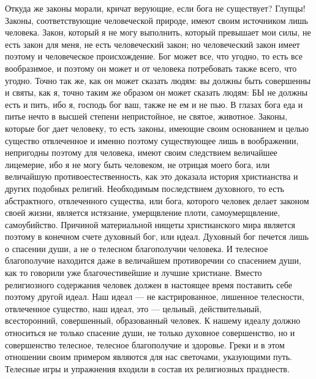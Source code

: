 \documentclass[12pt]{article}
\begin{document}
Откуда же законы морали, кричат верующие, если бога не существует? Глупцы! Законы, соответствующие человеческой природе, имеют своим источником лишь человека. Закон, который я не могу выполнить, который превышает мои силы, не есть закон для меня, не есть человеческий закон; но человеческий закон имеет поэтому и человеческое происхождение. Бог может все, что угодно, то есть все вообразимое, и поэтому он может и от человека потребовать также всего, что угодно. Точно так же, как он может сказать людям: вы должны быть совершенны и святы, как я, точно таким же образом он может сказать людям: БЫ не должны есть и пить, ибо я, господь бог ваш, также не ем и не пью. В глазах бога еда и питье нечто в высшей степени непристойное, не святое, животное. Законы, которые бог дает человеку, то есть законы, имеющие своим основанием и целью существо отвлеченное и именно поэтому существующее лишь в воображении, непригодны поэтому для человека, имеют своим следствием величайшее лицемерие, ибо я не могу быть человеком, не отрицая моего бога, или величайшую противоестественность, как это доказала история христианства и других подобных религий. Необходимым последствием духовного, то есть абстрактного, отвлеченного существа, или бога, которого человек делает законом своей жизни, является истязание, умерщвление плоти, самоумерщвление, самоубийство. Причиной материальной нищеты христианского мира является поэтому в конечном счете духовный бог, или идеал. Духовный бог печется лишь о спасении души, а не о телесном благополучии человека. И телесное благополучие находится даже в величайшем противоречии со спасением души, как то говорили уже благочестивейшие и лучшие христиане. Вместо религиозного содержания человек должен в настоящее время поставить себе поэтому другой идеал. Наш идеал --- не кастрированное, лишенное телесности, отвлеченное существо, наш идеал, это --- цельный, действительный, всесторонний, совершенный, образованный человек. К нашему идеалу должно относиться не только спасение души, не только духовное совершенство, но и совершенство телесное, телесное благополучие и здоровье. Греки и в этом отношении своим примером являются для нас светочами, указующими путь. Телесные игры и упражнения входили в состав их религиозных празднеств. 
\end{document}
